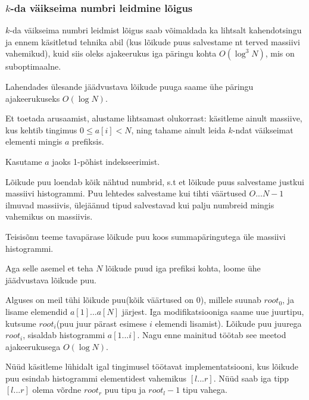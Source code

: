 \documentclass{trkut}
\theoremstyle{definition}
\begin{document}
\subsubsection{$k$-da väikseima numbri leidmine lõigus}

$k$-da väikseima numbri leidmist lõigus saab võimaldada ka lihtsalt kahendotsingu ja ennem käsitletud tehnika abil (kus lõikude puus salvestame nt terved massiivi vahemikud), kuid siis oleks ajakeerukus iga päringu kohta $O(\log^3 N)$, mis on suboptimaalne. \parencite{EMaxx}

Lahendades ülesande jäädvustava lõikude puuga saame ühe päringu ajakeerukuseks $O(\log N)$. \parencite{EMaxx}

Et toetada arusaamist, alustame lihtsamast olukorrast: käsitleme ainult massiive, kus kehtib tingimus $0 \leq a[i] < N$, ning tahame ainult leida $k$-ndat väikseimat elementi mingis $a$ prefiksis. 

Kasutame $a$ jaoks 1-põhist indekseerimist.

Lõikude puu loendab kõik nähtud numbrid, s.t et lõikude puus salvestame justkui massiivi histogrammi. 
Puu lehtedes salvestame kui tihti väärtused $O...N-1$ ilmuvad massiivis, ülejäänud tipud salvestavad kui palju numbreid mingis vahemikus on massiivis.  \parencite{EMaxx}

Teisisõnu teeme tavapärase lõikude puu koos summapäringutega üle massiivi histogrammi.

Aga selle asemel et teha $N$ lõikude puud iga prefiksi kohta, loome ühe jäädvustava lõikude puu.

Alguses on meil tühi lõikude puu(kõik väärtused on $0$), millele suunab $root_0$, ja lisame elemendid $a[1]...a[N]$ järjest. Iga modifikatsiooniga saame uue juurtipu, kutsume $root_i$(puu juur pärast esimese $i$ elemendi lisamist).
Lõikude puu juurega $root_i$, sisaldab histogrammi $a[1...i]$. Nagu enne mainitud töötab see meetod ajakeerukusega $O(\log N)$. \parencite{EMaxx}

Nüüd käsitleme lühidalt igal tingimusel töötavat implementatsiooni, kus lõikude puu esindab histogrammi elementidest vahemikus $[l...r]$.
Nüüd saab iga tipp $[l...r]$ olema võrdne $root_r$ puu tipu ja $root_l-1$ tipu vahega.
\end{document}
